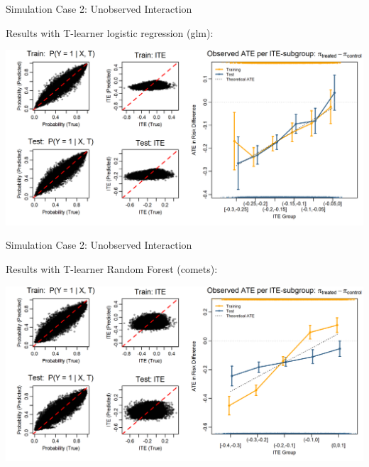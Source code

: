 \documentclass[onlytextwidth,english]{beamer}\usepackage[]{graphicx}\usepackage[]{xcolor}
\begin{document}
\begin{frame}{Simulation Case 2: Unobserved Interaction}

Results with T-learner logistic regression (glm):

\includegraphics[width=\textwidth]{img/unobserved_interaction_glm_tlearner.png}

\end{frame}

\begin{frame}{Simulation Case 2: Unobserved Interaction}

Results with T-learner Random Forest (comets):

\includegraphics[width=\textwidth]{img/unobserved_tuned_rf.png}

\end{frame}
\end{document}
